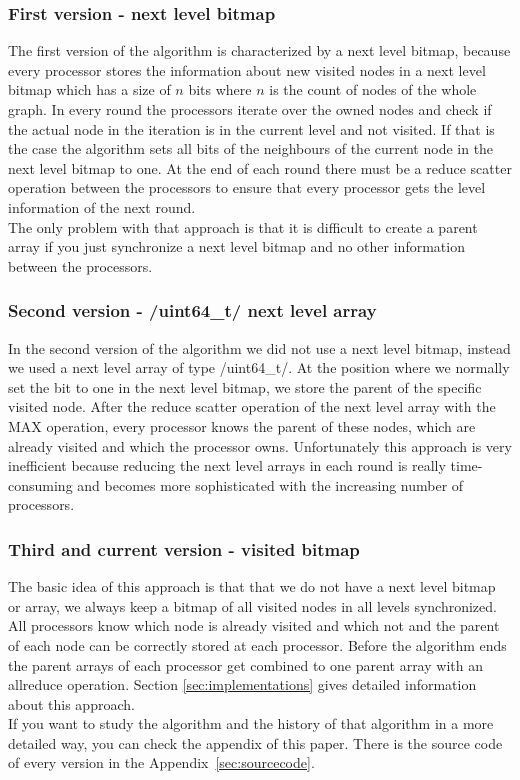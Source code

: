 \documentclass[12pt,a4paper]{article}
\begin{document}
\subsubsection{First version - next level bitmap}
\label{sec:firstversion}

The first version of the algorithm is characterized by a next level bitmap, because every processor stores the information about new visited nodes in a next level bitmap which has a size of \(n\) bits where \(n\) is the count of nodes of the whole graph. In every round the processors iterate over the owned nodes and check if the actual node in the iteration is in the current level and not visited. If that is the case the algorithm sets all bits of the neighbours of the current node in the next level bitmap to one. At the end of each round there must be a reduce scatter operation between the processors to ensure that every processor gets the level information of the next round.\\
The only problem with that approach is that it is difficult to create a parent array if you just synchronize a next level bitmap and no other information between the processors.

\subsubsection{Second version - \cinline/uint64_t/ next level array}
\label{sec:secondversion}

In the second version of the algorithm we did not use a next level bitmap, instead we used a next level array of type \cinline/uint64_t/. At the position where we normally set the bit to one in the next level bitmap, we store the parent of the specific visited node. After the reduce scatter operation of the next level array with the MAX operation, every processor knows the parent of these nodes, which are already visited and which the processor owns. Unfortunately this approach is very inefficient because reducing the next level arrays in each round is really time-consuming and becomes more sophisticated with the increasing number of processors.

\subsubsection{Third and current version - visited bitmap}
\label{sec:thirdversion}

The basic idea of this approach is that that we do not have a next level bitmap or array, we always keep a bitmap of all visited nodes in all levels synchronized. All processors know which node is already visited and which not and the parent of each node can be correctly stored at each processor. Before the algorithm ends the parent arrays of each processor get combined to one parent array with an allreduce operation. Section \ref{sec:implementations} gives detailed information about this approach.\\
If you want to study the algorithm and the history of that algorithm in a more detailed way, you can check the appendix of this paper. There is the source code of every version in the Appendix~\ref{sec:sourcecode}.
\end{document}
